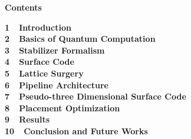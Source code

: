 \documentclass[a4paper,11pt]{ltjsarticle}
\begin{document}
\huge\bfseries{Contents}

\vspace{10pt}
\Large\bfseries{
1\ \ Introduction\\
2\ \ Basics of Quantum Computation\\
3\ \ Stabilizer Formalism\\
4\ \ Surface Code\\
5\ \ Lattice Surgery\\
6\ \ Pipeline Architecture\\
7\ \ Pseudo-three Dimensional Surface Code\\
8\ \ Placement Optimization\\
9\ \ Results\\
10\ \ Conclusion and Future Works\\
}
\end{document}
